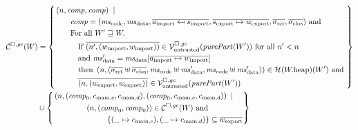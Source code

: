 \begin{jversion}
\begin{definition}
  \label{def:component-rel}
\begin{align*}
  \lrcomp(W) &=
  \left\{\begin{aligned}
     &\npair{\var{comp},\var{comp}} \;\mid \;\\
      &\qquad\var{comp} = (\mscode,\msdata,\overline{a_{\mathrm{import}} \mapsfrom s_{\mathrm{import}}},\overline{s_{\mathrm{export}} \mapsto w_{\mathrm{export}}},\sigrets,\sigcloss) \tand \\
      &\qquad\text{For all } W' \future W \ldotp \\
      &\qquad\quad\text{If } \overline{\npair[n']{(w_{\mathrm{import}},w_{\mathrm{import}})}} \in \lrv(\purePart{W'}) \text{ for all $n' < n$}\\
      &\qquad\quad\text{and } \msdata' = \msdata{}[\overline{a_{\mathrm{import}} \mapsto w_{\mathrm{import}}}] \\
      &\qquad\quad\text{then } \npair{(\sigrets\uplus\sigcloss,\mscode\uplus \msdata', \mscode\uplus\msdata')} \in \lrheap(\pwheap)(W') \tand\\
      &\qquad\quad\overline{\npair{(w_{\mathrm{export}},w_{\mathrm{export}})}} \in \lrv(\purePart{W'})
  \end{aligned}
    \right\}\\
  &\cup \left\{
    \begin{multlined}
     \npair{(\var{comp}_0,c_{\mathrm{main},c}, c_{\mathrm{main},d}),(\var{comp}_0,c_{\mathrm{main},c}, c_{\mathrm{main},d})} \;\mid \;\\
     \npair{(\var{comp}_0,\var{comp}_0)} \in \lrcomp(W) \tand\\
     \{(\_ \mapsto c_{\mathrm{main},c}),(\_ \mapsto c_{\mathrm{main},d})\} \subseteq \overline{w_{\mathrm{export}}}
       \end{multlined}
    \right\} 
\end{align*}
\end{definition}


\end{jversion}
